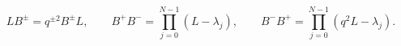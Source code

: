 \begin{equation}\label{q-alg}
LB^\pm=q^{\pm 2}B^\pm L,\qquad
B^+B^-=\prod_{j=0}^{N-1}(L-\lambda_j),\qquad
B^-B^+=\prod_{j=0}^{N-1}(q^2L-\lambda_j).
\end{equation}

